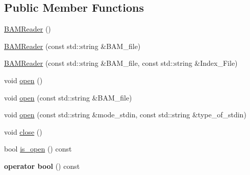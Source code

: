 \subsection*{Public Member Functions}
\begin{DoxyCompactItemize}
\item 
\hyperlink{class_b_a_m_reader_a85d3f6b07c7d5fb373445a8494f5dc21}{BAMReader} ()
\item 
\hyperlink{class_b_a_m_reader_add2b99c8016d3babbee3761944b747c4}{BAMReader} (const std::string \&BAM\_\-file)
\item 
\hyperlink{class_b_a_m_reader_a48e691d891ee2aab6909712e7fb59f57}{BAMReader} (const std::string \&BAM\_\-file, const std::string \&Index\_\-File)
\item 
void \hyperlink{class_b_a_m_reader_a3d36c9ac10d8fd1bcb1303563d1ed31c}{open} ()
\item 
void \hyperlink{class_b_a_m_reader_ae9366fa9633aa9366e1b87ee82043cc0}{open} (const std::string \&BAM\_\-file)
\item 
void \hyperlink{class_b_a_m_reader_a6513bdca6cd2c1c1b3c3f53a1a00a771}{open} (const std::string \&mode\_\-stdin, const std::string \&type\_\-of\_\-stdin)
\item 
void \hyperlink{class_b_a_m_reader_a68972b171921c6019128a6558d76ca4b}{close} ()
\item 
bool \hyperlink{class_b_a_m_reader_a74559ce62f95808827c869fc0496f12d}{is\_\-open} () const 
\item 
\hypertarget{class_b_a_m_reader_a84d7e5d949659fe49b4bdd809ae1ddb6}{
{\bfseries operator bool} () const }
\label{class_b_a_m_reader_a84d7e5d949659fe49b4bdd809ae1ddb6}


\end{DoxyCompactItemize}
